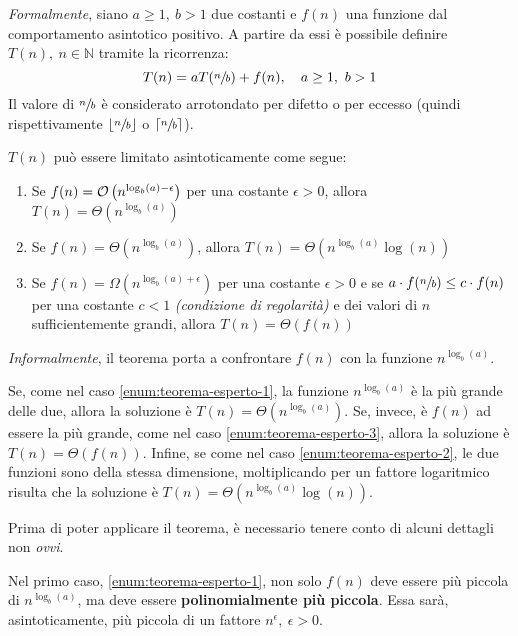 \documentclass[italian, 10pt]{article}
\begin{document}
\bigskip
\textit{Formalmente}, siano \(a \geq 1,\ b > 1\) due costanti e \(f(n)\) una funzione dal comportamento asintotico positivo.
A partire da essi è possibile definire \(T(n),\ n \in \mathbb{N}\) tramite la ricorrenza:
\[ T(n) = aT(\sfrac{n}{b}) + f(n) , \quad a \geq 1,\ b > 1 \]
Il valore di \(\sfrac{n}{b}\) è considerato arrotondato per difetto o per eccesso (quindi rispettivamente \(\lfloor\sfrac{n}{b}\rfloor\) o \(\lceil\sfrac{n}{b}\rceil\)).

\(T(n)\) può essere limitato asintoticamente come segue:

\begin{enumerate}[label=\arabic*), ref=(\arabic*)]
  \item\label{enum:teorema-esperto-1} Se \(f(n) = \mathcal{O}\left(n^{\log_b(a) - \epsilon}\right)\) per una costante \(\epsilon > 0\), allora \(T(n) = \Theta\left(n^{\log_b (a)}\right)\)
  \item\label{enum:teorema-esperto-2} Se \(f(n) = \Theta\left(n^{\log_b(a)}\right)\), allora \(T(n) = \Theta\left(n^{\log_b(a)} \log{(n)}\right)\)
  \item\label{enum:teorema-esperto-3} Se \(f(n) = \Omega\left(n^{\log_b(a) + \epsilon}\right)\) per una costante \(\epsilon > 0\) e se \(a \cdot f(\sfrac{n}{b}) \leq c \cdot f(n)\) per una costante \(c < 1\) \textit{(condizione di regolarità)} e dei valori di \(n\) sufficientemente grandi, allora \(T(n) = \Theta\left(f(n)\right)\)
\end{enumerate}

\bigskip
\textit{Informalmente}, il teorema porta a confrontare \(f(n)\) con la funzione \(n^{\log_b(a)}\).

Se, come nel caso \ref{enum:teorema-esperto-1}, la funzione \(n^{\log_b(a)}\) è la più grande delle due, allora la soluzione è \(T(n) = \Theta\left(n^{\log_b (a)}\right)\).
Se, invece, è \(f(n)\) ad essere la più grande, come nel caso \ref{enum:teorema-esperto-3}, allora la soluzione è \(T(n) = \Theta\left(f(n)\right)\).
Infine, se come nel caso \ref{enum:teorema-esperto-2}, le due funzioni sono della stessa dimensione, moltiplicando per un fattore logaritmico risulta che la soluzione è \(T(n) = \Theta\left(n^{\log_b(a)} \log{(n)}\right)\).

\bigskip
Prima di poter applicare il teorema, è necessario tenere conto di alcuni dettagli non \textit{ovvi}.

Nel primo caso, \ref{enum:teorema-esperto-1}, non solo \(f(n)\) deve essere più piccola di \(n^{\log_b(a)}\), ma deve essere \textbf{polinomialmente più piccola}.
Essa sarà, asintoticamente, più piccola di un fattore \(n^\epsilon,\ \epsilon>0\).
\end{document}
